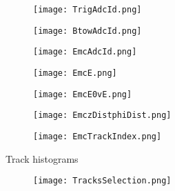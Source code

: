\documentclass{beamer}
\begin{document}
\begin{frame}
  \begin{figure}[h!]
  \centering
  \texttt{[image: TrigAdcId.png]}
  \end{figure}
\end{frame}

\begin{frame}
  \begin{figure}[h!]
  \centering
  \texttt{[image: BtowAdcId.png]}
  \end{figure}
\end{frame}

\begin{frame}
  \begin{figure}[h!]
  \centering
  \texttt{[image: EmcAdcId.png]}
  \end{figure}
\end{frame}

\begin{frame}
  \begin{figure}[h!]
  \centering
  \texttt{[image: EmcE.png]}
  \end{figure}
\end{frame}

\begin{frame}
  \begin{figure}[h!]
  \centering
  \texttt{[image: EmcE0vE.png]}
  \end{figure}
\end{frame}

\begin{frame}
  \begin{figure}[h!]
  \centering
  \texttt{[image: EmczDistphiDist.png]}
  \end{figure}
\end{frame}

\begin{frame}
  \begin{figure}[h!]
  \centering
  \texttt{[image: EmcTrackIndex.png]}
  \end{figure}
\end{frame}

\begin{frame}
  \begin{center}
 	\Huge Track histograms
 	\end{center}
\end{frame}

\begin{frame}
  \begin{figure}[h!]
  \centering
  \texttt{[image: TracksSelection.png]}
  \end{figure}
\end{frame}
\end{document}
